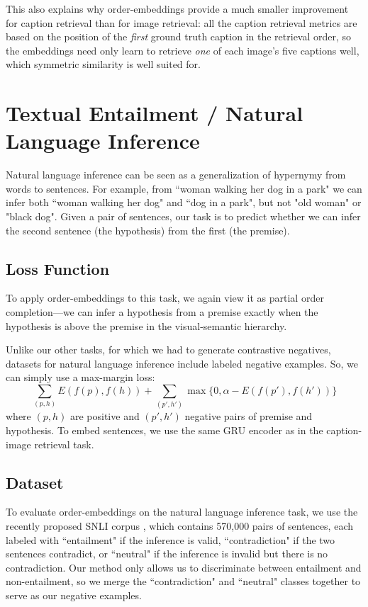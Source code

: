 \documentclass{article} \usepackage{iclr2016_conference,times}
\begin{document}
This also explains why order-embeddings provide a much smaller improvement for caption retrieval than for image retrieval: all the caption retrieval metrics are based on the position of the \emph{first} ground truth caption in the retrieval order, so the embeddings need only learn to retrieve \emph{one} of each image's five captions well, which symmetric similarity is well suited for. 

\section{Textual Entailment / Natural Language Inference}
\label{entailment}
Natural language inference can be seen as a generalization of hypernymy from words to sentences. For example, from ``woman walking her dog in a park" we can infer both ``woman walking her dog" and ``dog in a park", but not "old woman" or "black dog".  Given a pair of sentences, our task is to predict whether we can infer the second sentence (the hypothesis) from the first (the premise).

\vspace{-0.5mm}
\subsection{Loss Function}
To apply order-embeddings to this task, we again view it as partial order completion---we can infer a hypothesis from a premise exactly when the hypothesis is above the premise in the visual-semantic hierarchy.

Unlike our other tasks, for which we had to generate contrastive negatives,  datasets for natural language inference include labeled negative examples. So, we can simply use a max-margin loss:
\begin{equation} \sum_{(p,h)} E(f(p), f(h))  + \sum_{(p', h')} \max\{0, \alpha - E(f(p'), f(h')) \}  \label{eq:margin2} \end{equation}
where $(p, h)$ are positive and $(p', h')$ negative pairs of premise and hypothesis.
To embed sentences, we use the same GRU encoder as in the caption-image retrieval task.

\vspace{-0.5mm}
\subsection{Dataset}


To evaluate order-embeddings on the natural language inference task, we use the recently proposed SNLI corpus \citep{snli}, which contains 570,000 pairs of sentences, each labeled with ``entailment" if the inference is valid, ``contradiction" if the two sentences contradict, or ``neutral" if the inference is invalid but there is no contradiction.
Our method only allows us to discriminate between entailment and non-entailment, so we merge the ``contradiction" and ``neutral" classes together to serve as our negative examples. 
\end{document}

